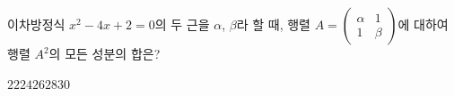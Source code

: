 이차방정식 $x^2-4x+2=0$의 두 근을 $\alpha$, $\beta$라 할 때, 행렬 $A=\begin{pmatrix} \alpha & 1 \\ 1 & \beta \end{pmatrix}$에 대하여 행렬 $A^2$의 모든 성분의 합은?
\begin{choices32}{$22$}{$24$}{$26$}{$28$}{$30$}\end{choices32}
